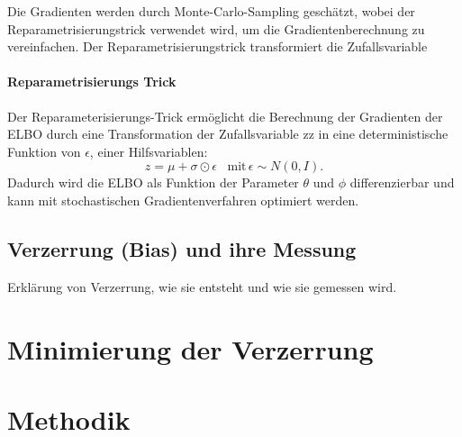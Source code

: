 \documentclass[%
thesis=student,%
coverpage=false,%
titlepage=false,%
headmarks=true, %
german,%
font=libertine, %
math=newpxtx, %
BCOR=5mm,%
coverBCOR=11mm%
]{tumbook}
\theoremstyle{break}
\begin{document}
Die Gradienten werden durch Monte-Carlo-Sampling geschätzt, wobei der Reparametrisierungstrick verwendet wird, um die Gradientenberechnung zu vereinfachen. Der Reparametrisierungstrick transformiert die Zufallsvariable  
\subsubsection{Reparametrisierungs Trick}
Der Reparameterisierungs-Trick ermöglicht die Berechnung der Gradienten der ELBO durch eine Transformation der Zufallsvariable zz in eine deterministische Funktion von $\epsilon$, einer Hilfsvariablen:
$$z=\mu + \sigma \odot \epsilon \hspace{10pt}\text{mit} \hspace{2pt} \epsilon\sim N(0,I).$$ 
Dadurch wird die ELBO als Funktion der Parameter $\theta$ und $\phi$ differenzierbar und kann mit stochastischen Gradientenverfahren optimiert werden.
\section{Verzerrung (Bias) und ihre Messung}
Erklärung von Verzerrung, wie sie entsteht und wie sie gemessen wird.

\chapter{Minimierung der Verzerrung}

\chapter{Methodik}
\end{document}
